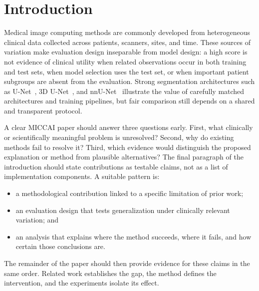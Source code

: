 \section{Introduction}
\label{sec:introduction}

Medical image computing methods are commonly developed from heterogeneous
clinical data collected across patients, scanners, sites, and time.  These
sources of variation make evaluation design inseparable from model design: a
high score is not evidence of clinical utility when related observations occur
in both training and test sets, when model selection uses the test set, or when
important patient subgroups are absent from the evaluation.  Strong
segmentation architectures such as U-Net~\cite{ronneberger2015unet}, 3D
U-Net~\cite{cicek20163d}, and nnU-Net~\cite{isensee2021nnu} illustrate the value
of carefully matched architectures and training pipelines, but fair comparison
still depends on a shared and transparent protocol.

A clear MICCAI paper should answer three questions early.  First, what
clinically or scientifically meaningful problem is unresolved?  Second, why do
existing methods fail to resolve it?  Third, which evidence would distinguish
the proposed explanation or method from plausible alternatives?  The final
paragraph of the introduction should state contributions as testable claims,
not as a list of implementation components.  A suitable pattern is:

\begin{itemize}
  \item a methodological contribution linked to a specific limitation of prior
        work;
  \item an evaluation design that tests generalization under clinically
        relevant variation; and
  \item an analysis that explains where the method succeeds, where it fails,
        and how certain those conclusions are.
\end{itemize}

The remainder of the paper should then provide evidence for these claims in
the same order.  Related work establishes the gap, the method defines the
intervention, and the experiments isolate its effect.
